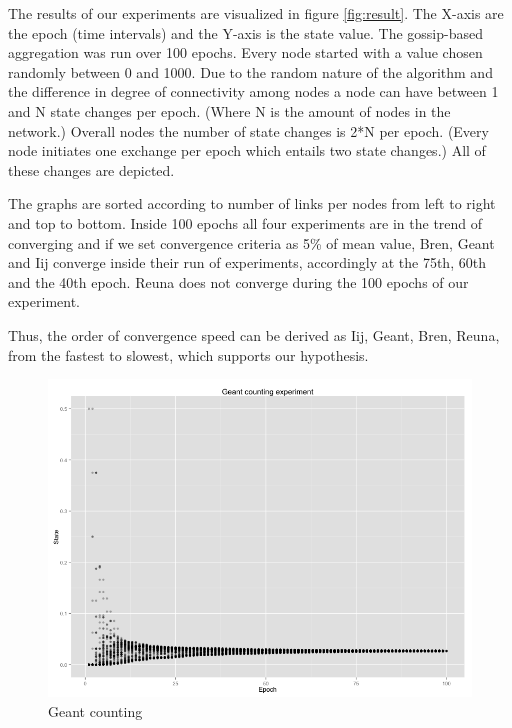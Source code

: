 The results of our experiments are visualized in figure \ref{fig:result}. The X-axis are the epoch (time intervals) and the Y-axis is the state value. The gossip-based aggregation was run over 100 epochs. Every node started with a value chosen randomly between 0 and 1000. Due to the random nature of the algorithm and the difference in degree of connectivity among nodes a node can have between 1 and N state changes per epoch. (Where N is the amount of nodes in the network.) Overall nodes the number of state changes is 2*N per epoch. (Every node initiates one exchange per epoch which entails two state changes.) All of these changes are depicted.

The graphs are sorted according to number of links per nodes from left to right and top to bottom. Inside 100 epochs all four experiments are in the trend of converging and if we set convergence criteria as 5\% of mean value, Bren, Geant and Iij converge inside their run of experiments, accordingly at the 75th, 60th and the 40th epoch. Reuna does not converge during the 100 epochs of our experiment.

Thus, the order of convergence speed can be derived as Iij, Geant, Bren, Reuna, from the fastest to slowest, which supports our hypothesis.

\begin{figure}[h!]
    \begin{center}
    \includegraphics[scale=0.4]{figures/geant_counting_exp.png}
    \end{center}
    \caption{Geant counting}
    \label{fig:geant}
\end{figure}
\label{sec:results}
